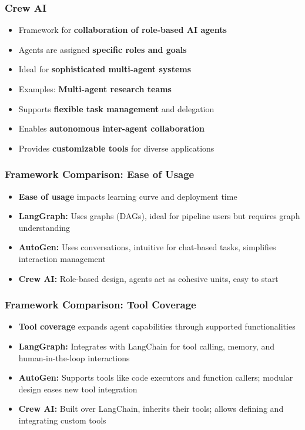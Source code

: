 \begin{frame}[fragile]\frametitle{Crew AI}
\begin{itemize}
    \item Framework for \textbf{collaboration of role-based AI agents}
    \item Agents are assigned \textbf{specific roles and goals}
    \item Ideal for \textbf{sophisticated multi-agent systems}
    \item Examples: \textbf{Multi-agent research teams}
    \item Supports \textbf{flexible task management} and delegation
    \item Enables \textbf{autonomous inter-agent collaboration}
    \item Provides \textbf{customizable tools} for diverse applications
\end{itemize}
\end{frame}

\begin{frame}[fragile]\frametitle{Framework Comparison: Ease of Usage}
\begin{itemize}
    \item \textbf{Ease of usage} impacts learning curve and deployment time
    \item \textbf{LangGraph:} Uses graphs (DAGs), ideal for pipeline users but requires graph understanding
    \item \textbf{AutoGen:} Uses conversations, intuitive for chat-based tasks, simplifies interaction management
    \item \textbf{Crew AI:} Role-based design, agents act as cohesive units, easy to start
\end{itemize}
\end{frame}

\begin{frame}[fragile]\frametitle{Framework Comparison: Tool Coverage}
\begin{itemize}
    \item \textbf{Tool coverage} expands agent capabilities through supported functionalities
    \item \textbf{LangGraph:} Integrates with LangChain for tool calling, memory, and human-in-the-loop interactions
    \item \textbf{AutoGen:} Supports tools like code executors and function callers; modular design eases new tool integration
    \item \textbf{Crew AI:} Built over LangChain, inherits their tools; allows defining and integrating custom tools
\end{itemize}
\end{frame}

